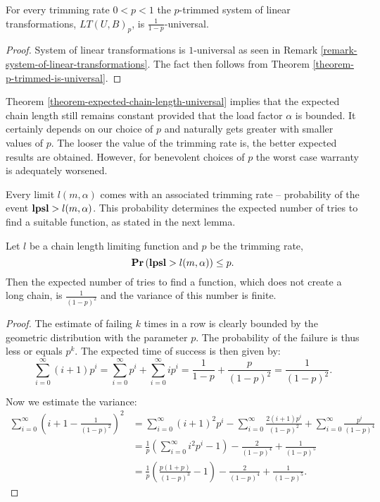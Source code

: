 \begin{corollary}
\label{corollary-trimming-linear}
For every trimming rate $0 < p < 1$ the $p$-trimmed system of linear transformations, $LT(U, B)_p$, is $\frac{1}{1 - p}$-universal.
\end{corollary}
\begin{proof}
System of linear transformations is $1$-universal as seen in Remark \ref{remark-system-of-linear-transformations}. The fact then follows from  Theorem \ref{theorem-p-trimmed-is-universal}.
\end{proof}

Theorem \ref{theorem-expected-chain-length-universal} implies that the expected chain length still remains constant provided that the load factor $\alpha$ is bounded. It certainly depends on our choice of $p$ and naturally gets greater with smaller values of $p$. The looser the value of the trimming rate is, the better expected results are obtained. However, for benevolent choices of $p$ the worst case warranty is adequately worsened.

Every limit $l(m, \alpha)$ comes with an associated trimming rate -- probability of the event $\mathbf{lpsl} > l(m, \alpha)$. This probability determines the expected number of tries to find a suitable function, as stated in the next lemma.

\begin{lemma}
\label{lemma-linear-transformations-tries}
Let $l$ be a chain length limiting function and $p$ be the trimming rate, \[ \mathbf{Pr}\left(\mathbf{lpsl} > l(m, \alpha)\right) \leq p \text{.} \] Then the expected number of tries to find a function, which does not create a long chain, is $\frac{1}{(1 - p)^2}$ and the variance of this number is finite.
\end{lemma}
\begin{proof}
The estimate of failing $k$ times in a row is clearly bounded by the geometric distribution with  the parameter $p$. The probability of the failure is thus less or equals $p ^ k$. The expected time of success is then given by:
\[
\sum_{i = 0}^{\infty} (i + 1)p^i = \sum_{i = 0}^{\infty}p^i + \sum_{i = 0}^{\infty}ip^i = \frac{1}{1 - p} + \frac{p}{(1- p)^2} = \frac{1}{(1 - p)^2} \text{.}
\]

Now we estimate the variance:
\[
\begin{split}
\sum_{i = 0}^{\infty} \left(i + 1 - \frac{1}{(1 - p) ^ 2}\right) ^ 2  
	& = \sum_{i = 0}^{\infty} \left(i + 1\right) ^ 2 p ^ i - \sum_{i = 0}^{\infty} \frac{2(i + 1)p ^ i}{(1 - p) ^ 2} +   \sum_{i = 0}^{\infty} \frac{p ^ i}{(1 - p) ^ 4} \\
	& = \frac{1}{p}\left(\sum_{i = 0}^{\infty} i ^ 2 p ^ i - 1 \right) - \frac{2}{(1 - p) ^ 4} + \frac{1}{(1 - p) ^ 5} \\
	& = \frac{1}{p}\left(\frac{p(1 + p)}{(1 - p) ^ 3} - 1\right) - \frac{2}{(1 - p) ^ 4} + \frac{1}{(1 - p) ^ 5}
	\text{.}
\end{split}
\]
\end{proof}

